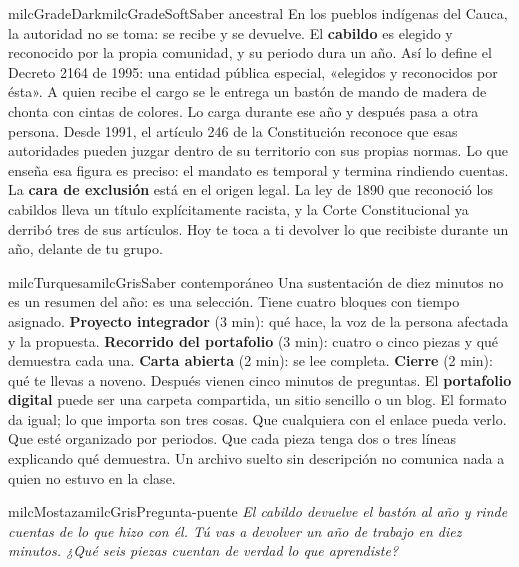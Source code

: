 \documentclass[11pt,letterpaper]{article}
\begin{document}
\begin{softbox}{milcGradeDark}{milcGradeSoft}{Saber ancestral}
En los pueblos indígenas del Cauca, la autoridad no se toma: se recibe y se devuelve. El \textbf{cabildo} es elegido y reconocido por la propia comunidad, y su periodo dura un año. Así lo define el Decreto 2164 de 1995: una entidad pública especial, «elegidos y reconocidos por ésta». A quien recibe el cargo se le entrega un bastón de mando de madera de chonta con cintas de colores. Lo carga durante ese año y después pasa a otra persona. Desde 1991, el artículo 246 de la Constitución reconoce que esas autoridades pueden juzgar dentro de su territorio con sus propias normas. Lo que enseña esa figura es preciso: el mandato es temporal y termina rindiendo cuentas. La \textbf{cara de exclusión} está en el origen legal. La ley de 1890 que reconoció los cabildos lleva un título explícitamente racista, y la Corte Constitucional ya derribó tres de sus artículos. Hoy te toca a ti devolver lo que recibiste durante un año, delante de tu grupo.\par{}
\end{softbox}

\begin{softbox}{milcTurquesa}{milcGris}{Saber contemporáneo}
Una sustentación de diez minutos no es un resumen del año: es una selección. Tiene cuatro bloques con tiempo asignado. \textbf{Proyecto integrador} (3 min): qué hace, la voz de la persona afectada y la propuesta. \textbf{Recorrido del portafolio} (3 min): cuatro o cinco piezas y qué demuestra cada una. \textbf{Carta abierta} (2 min): se lee completa. \textbf{Cierre} (2 min): qué te llevas a noveno. Después vienen cinco minutos de preguntas. El \textbf{portafolio digital} puede ser una carpeta compartida, un sitio sencillo o un blog. El formato da igual; lo que importa son tres cosas. Que cualquiera con el enlace pueda verlo. Que esté organizado por periodos. Que cada pieza tenga dos o tres líneas explicando qué demuestra. Un archivo suelto sin descripción no comunica nada a quien no estuvo en la clase.
\end{softbox}

\begin{softbox}{milcMostaza}{milcGris}{Pregunta-puente}
\textit{El cabildo devuelve el bastón al año y rinde cuentas de lo que hizo con él. Tú vas a devolver un año de trabajo en diez minutos. ¿Qué seis piezas cuentan de verdad lo que aprendiste?}
\end{softbox}
\end{document}
